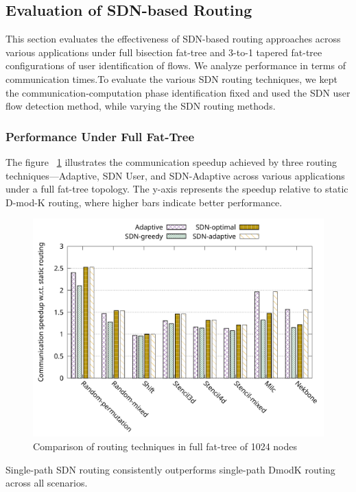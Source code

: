 \subsection{Evaluation of SDN-based Routing}
This section evaluates the effectiveness of SDN-based routing approaches across various applications under full bisection fat-tree and 3-to-1 tapered fat-tree configurations of user identification of flows. We analyze performance in terms of communication times.To evaluate the various SDN routing techniques, we kept the communication‑computation phase identification fixed and used the SDN user flow detection method, while varying the SDN routing methods.

\subsubsection{Performance Under Full Fat-Tree}
The figure ~\ref{fig:routing_full} illustrates the communication speedup achieved by three routing techniques—Adaptive, SDN User, and SDN-Adaptive across various applications under a full fat-tree topology. The y-axis represents the speedup relative to static D-mod-K routing, where higher bars indicate better performance.


\begin{figure}[h]
  \centering
  \includegraphics[width=\columnwidth]{./figs_4/routing_full.pdf}
  \caption{Comparison of routing techniques in full fat-tree of 1024 nodes}
  \label{fig:routing_full}
\end{figure}
Single-path SDN routing consistently outperforms single-path DmodK routing across all scenarios.

